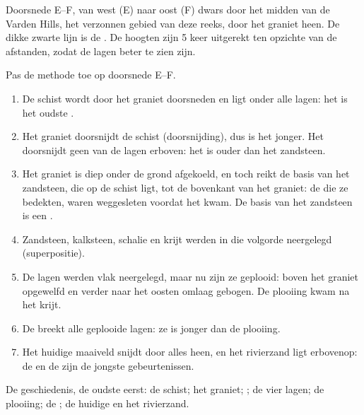 \begin{omfigure}
\smallskip
{\small Doorsnede E--F, van west (E) naar oost (F) dwars door het midden van
de Varden Hills, het verzonnen gebied van deze reeks, door het graniet
heen. De dikke zwarte lijn is de . De hoogten zijn 5 keer uitgerekt
ten opzichte van de afstanden, zodat de lagen beter te zien zijn.}
\label{fig:g7:geological-time:section}
\end{omfigure}

\begin{example}\label{ex:g7:geological-time:varden}
Pas de methode toe op doorsnede E--F.
\begin{enumerate}
  \item De schist wordt door het graniet doorsneden en ligt onder alle
        lagen: het is het oudste .
  \item Het graniet doorsnijdt de schist (doorsnijding), dus is het
        jonger. Het doorsnijdt geen van de lagen erboven: het is ouder dan
        het zandsteen.
  \item Het graniet is diep onder de grond afgekoeld, en toch reikt de
        basis van het zandsteen, die op de schist ligt, tot de bovenkant
        van het graniet: de  die ze bedekten, waren weggesleten
        voordat het  kwam. De basis van het zandsteen is een
        .
  \item Zandsteen, kalksteen, schalie en krijt werden in die volgorde
        neergelegd (superpositie).
  \item De lagen werden vlak neergelegd, maar nu zijn ze geplooid: boven
        het graniet opgewelfd en verder naar het oosten omlaag gebogen. De
        plooiing kwam na het krijt.
  \item De  breekt alle geplooide lagen: ze is jonger dan de
        plooiing.
  \item Het huidige maaiveld snijdt door alles heen, en het rivierzand ligt
        erbovenop: de  en de  zijn de jongste gebeurtenissen.
\end{enumerate}
De geschiedenis, de oudste eerst: de schist; het graniet; ; de vier
lagen; de plooiing; de ; de huidige  en het rivierzand.
\end{example}

